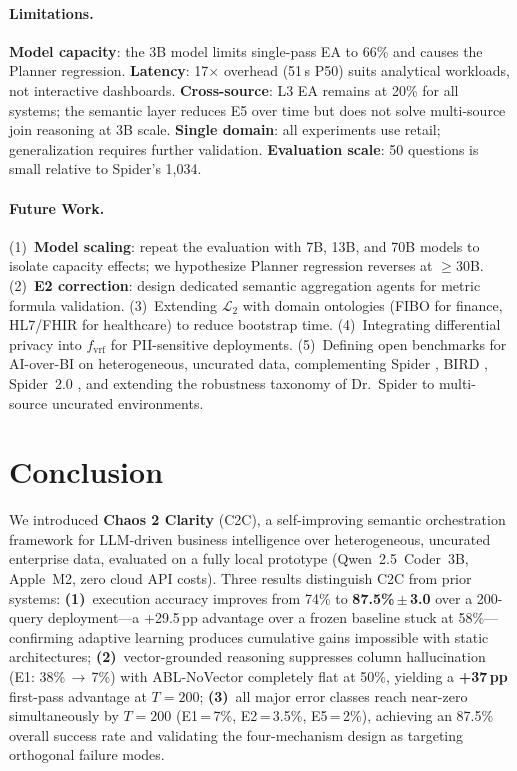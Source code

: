 \documentclass[11pt,a4paper]{article}
\begin{document}
\paragraph{Limitations.}
\textbf{Model capacity}: the 3B model limits single-pass EA to 66\% and causes
the Planner regression.  \textbf{Latency}: 17$\times$ overhead (51\,s P50) suits
analytical workloads, not interactive dashboards.  \textbf{Cross-source}: L3 EA
remains at 20\% for all systems; the semantic layer reduces E5 over time but does
not solve multi-source join reasoning at 3B scale.  \textbf{Single domain}: all
experiments use retail; generalization requires further validation.
\textbf{Evaluation scale}: 50 questions is small relative to Spider's 1,034.

\paragraph{Future Work.}
(1)~\textbf{Model scaling}: repeat the evaluation with 7B, 13B, and 70B models to
isolate capacity effects; we hypothesize Planner regression reverses at $\geq$30B.
(2)~\textbf{E2 correction}: design dedicated semantic aggregation agents for metric
formula validation.
(3)~Extending $\mathcal{L}_2$ with domain ontologies (FIBO for finance, HL7/FHIR
for healthcare) to reduce bootstrap time.
(4)~Integrating differential privacy \citep{dwork2006calibrating} into
$f_\mathrm{vrf}$ for PII-sensitive deployments.
(5)~Defining open benchmarks for AI-over-BI on heterogeneous, uncurated data,
complementing Spider \citep{yu2018spider}, BIRD \citep{li2023bird},
Spider~2.0 \citep{lei2024spider2}, and extending the robustness taxonomy of
Dr.~Spider \citep{chang2023drspider} to multi-source uncurated environments.

\section{Conclusion}\label{sec:conclusion}

We introduced \textbf{Chaos 2 Clarity} (C2C), a self-improving semantic
orchestration framework for LLM-driven business intelligence over heterogeneous,
uncurated enterprise data, evaluated on a fully local prototype (Qwen~2.5~Coder~3B,
Apple~M2, zero cloud API costs).  Three results distinguish C2C from prior systems:
\textbf{(1)}~execution accuracy improves from 74\% to \textbf{87.5\%\,$\pm$\,3.0}
over a 200-query deployment---a +29.5\,pp advantage over a frozen baseline stuck
at 58\%---confirming adaptive learning produces cumulative gains impossible with
static architectures; \textbf{(2)}~vector-grounded reasoning suppresses column
hallucination (E1: 38\%\,$\to$\,7\%) with ABL-NoVector completely flat at 50\%,
yielding a \textbf{+37\,pp} first-pass advantage at $T{=}200$; \textbf{(3)}~all
major error classes reach near-zero simultaneously by $T{=}200$ (E1\,=\,7\%,
E2\,=\,3.5\%, E5\,=\,2\%), achieving an 87.5\% overall success rate and validating
the four-mechanism design as targeting orthogonal failure modes.
\end{document}
